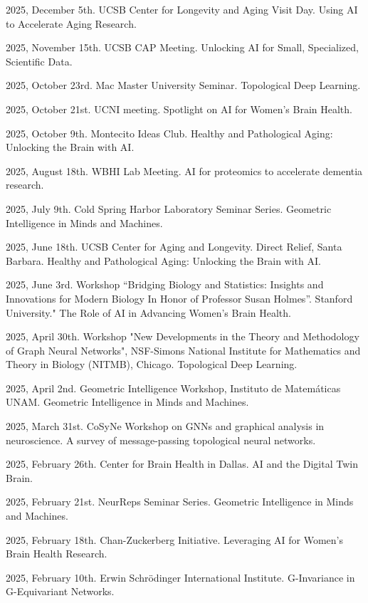2025, December 5th. UCSB Center for Longevity and Aging Visit Day. Using AI to Accelerate Aging Research.

2025, November 15th. UCSB CAP Meeting. Unlocking AI for Small, Specialized, Scientific Data.

2025, October 23rd. Mac Master University Seminar. Topological Deep Learning.

2025, October 21st. UCNI meeting. Spotlight on AI for Women’s Brain Health.

2025, October 9th. Montecito Ideas Club. Healthy and Pathological Aging: Unlocking the Brain with AI.

2025, August 18th. WBHI Lab Meeting. AI for proteomics to accelerate dementia research.

2025, July 9th. Cold Spring Harbor Laboratory Seminar Series. Geometric Intelligence in Minds and Machines.

2025, June 18th. UCSB Center for Aging and Longevity. Direct Relief, Santa Barbara. Healthy and Pathological Aging: Unlocking the Brain with AI.

2025, June 3rd. Workshop “Bridging Biology and Statistics: Insights and Innovations for Modern Biology In Honor of Professor Susan Holmes”. Stanford University." The Role of AI in Advancing Women’s Brain Health.

2025, April 30th. Workshop "New Developments in the Theory and Methodology of Graph Neural Networks", NSF-Simons National Institute for Mathematics and Theory in Biology (NITMB), Chicago. Topological Deep Learning.

2025, April 2nd. Geometric Intelligence Workshop, Instituto de Matemáticas UNAM. Geometric Intelligence in Minds and Machines.

2025, March 31st. CoSyNe Workshop on GNNs and graphical analysis in neuroscience. A survey of message-passing topological neural networks.

2025, February 26th. Center for Brain Health in Dallas. AI and the Digital Twin Brain.

2025, February 21st. NeurReps Seminar Series. Geometric Intelligence in Minds and Machines.

2025, February 18th. Chan-Zuckerberg Initiative. Leveraging AI for Women’s Brain Health Research.

2025, February 10th. Erwin Schrödinger International Institute. G-Invariance in G-Equivariant Networks.